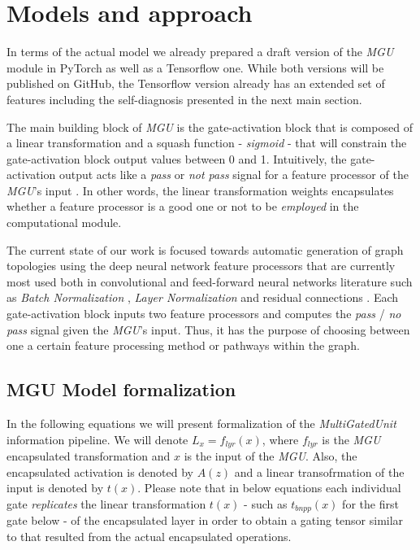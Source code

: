 \documentclass[11pt]{article}
\begin{document}
    \hypertarget{models-and-approach}{%
\section{Models and approach}\label{models-and-approach}}

In terms of the actual model we already prepared a draft version of the
\emph{MGU} module in PyTorch as well as a Tensorflow one. While both
versions will be published on GitHub, the Tensorflow version already has
an extended set of features including the self-diagnosis presented in
the next main section.

The main building block of \emph{MGU} is the gate-activation block that
is composed of a linear transformation and a squash function -
\emph{sigmoid} - that will constrain the gate-activation block output
values between 0 and 1. Intuitively, the gate-activation output acts
like a \emph{pass} or \emph{not pass} signal for a feature processor of
the \emph{MGU}'s input . In other words, the linear transformation
weights encapsulates whether a feature processor is a good one or not to
be \emph{employed} in the computational module.

The current state of our work is focused towards automatic generation of
graph topologies using the deep neural network feature processors that
are currently most used both in convolutional and feed-forward neural
networks literature such as \emph{Batch Normalization} \cite{Ioffe2015},
\emph{Layer Normalization} \cite{ba2016layer} and residual connections
\cite{He2016}. Each gate-activation block inputs two feature processors
and computes the \emph{pass} / \emph{no pass} signal given the
\emph{MGU}'s input. Thus, it has the purpose of choosing between one a
certain feature processing method or pathways within the graph.

\hypertarget{mgu-model-formalization}{%
\subsection{MGU Model formalization}\label{mgu-model-formalization}}

In the following equations we will present formalization of the
\emph{MultiGatedUnit} information pipeline. We will denote
\(L_x = f_{lyr}(x)\), where \(f_{lyr}\) is the \emph{MGU} encapsulated
transformation and \(x\) is the input of the \emph{MGU}. Also, the
encapsulated activation is denoted by \(A(z)\) and a linear
transofrmation of the input is denoted by \(t(x)\). Please note that in
below equations each individual gate \emph{replicates} the linear
transformation \(t(x)\) - such as \(t_{bnpp}(x)\) for the first gate
below - of the encapsulated layer in order to obtain a gating tensor
similar to that resulted from the actual encapsulated operations.
\end{document}
